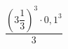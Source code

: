 \begin{ex}[type=calculate]
	\begin{condition}
		\( \dfrac{\left( 3\dfrac{1}{3} \right)^3\cdot0,1^3}{3} \)
	\end{condition}
\end{ex}